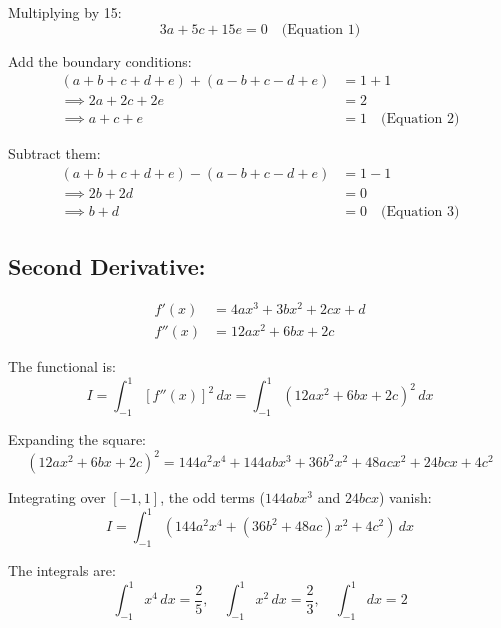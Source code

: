 \documentclass[12pt,a4paper]{article}
\theoremstyle{definition}
\begin{document}
    Multiplying by 15:
    \begin{equation}
        3a + 5c + 15e = 0 \quad \text{(Equation 1)}
    \end{equation}

    Add the boundary conditions:
    \begin{align}
    (a + b + c + d + e) + (a - b + c - d + e) &= 1 + 1 \\
    \implies 2a + 2c + 2e &= 2 \\
    \implies a + c + e &= 1 \quad \text{(Equation 2)}
    \end{align}

    Subtract them:
    \begin{align}
    (a + b + c + d + e) - (a - b + c - d + e) &= 1 - 1 \\
    \implies 2b + 2d &= 0 \\
    \implies b + d &= 0 \quad \text{(Equation 3)}
    \end{align}

    \subsection*{Second Derivative:}
    \begin{align}
        f'(x) &= 4a x^3 + 3b x^2 + 2c x + d \\
        f''(x) &= 12a x^2 + 6b x + 2c
    \end{align}

    The functional is:
    \begin{equation}
        I = \int_{-1}^{1} [f''(x)]^2 \, dx = \int_{-1}^{1} (12a x^2 + 6b x + 2c)^2 \, dx
    \end{equation}

    Expanding the square:
    \begin{equation}
    (12a x^2 + 6b x + 2c)^2 = 144a^2 x^4 + 144ab x^3 + 36b^2 x^2 + 48ac x^2 + 24bc x + 4c^2
    \end{equation}

    Integrating over $[-1, 1]$, the odd terms ($144ab x^3$ and $24bc x$) vanish:
    \begin{equation}
        I = \int_{-1}^{1} (144a^2 x^4 + (36b^2 + 48ac) x^2 + 4c^2) \, dx
    \end{equation}

    The integrals are:
    \begin{equation}
        \int_{-1}^{1} x^4 \, dx = \frac{2}{5}, \quad \int_{-1}^{1} x^2 \, dx = \frac{2}{3}, \quad \int_{-1}^{1} dx = 2
    \end{equation}
\end{document}

